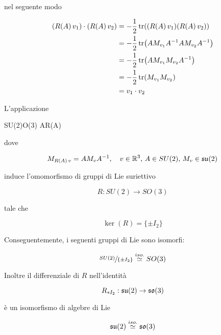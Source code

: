 nel seguente modo

\begin{align}
	\begin{split}
		(R(A) \, v_{1}) \cdot (R(A) \, v_{2}) &= - \dfrac{1}{2} \tr( (R(A) \, v_{1}) (R(A) \, v_{2}) )\\
		&= - \dfrac{1}{2} \tr( A M_{v_{1}} A^{-1} A M_{v_{2}} A^{-1} )\\
		&= - \dfrac{1}{2} \tr( A M_{v_{1}} M_{v_{2}} A^{-1} )\\
		&= - \dfrac{1}{2} \tr( M_{v_{1}} M_{v_{2}} )\\
		&= v_{1} \cdot v_{2}
	\end{split}
\end{align}

\begin{theorem}
	L'applicazione
	
		{SU(2)}{O(3)}%
		{A}{R(A)}
	
	dove
	
	\begin{equation}
		 M_{R(A) \, v} = A M_{v} A^{-1} \qcomma v \in \R^{3}, \, A \in SU(2), \, M_{v} \in \su(2)
	\end{equation}

	induce l'omomorfismo di gruppi di Lie suriettivo
	
	\begin{equation}
		R : SU(2) \to SO(3)
	\end{equation}

	tale che
	
	\begin{equation}
		\ker(R) = \{ \pm I_{2} \}
	\end{equation}

	Conseguentemente, i seguenti gruppi di Lie sono isomorfi:
	
	\begin{equation}
		\sfrac{SU(2)}{\{ \pm I_{2}\}} \stackrel{iso.}{\simeq} SO(3)
	\end{equation}

	Inoltre il differenziale di $ R $ nell'identità 
	
	\begin{equation}
		R_{*I_{2}} : \mathfrak{su}(2) \to \mathfrak{so}(3)
	\end{equation}

	è un isomorfismo di algebre di Lie
	
	\begin{equation}
		\mathfrak{su}(2) \stackrel{iso.}{\simeq} \mathfrak{so}(3)
	\end{equation}
\end{theorem}

